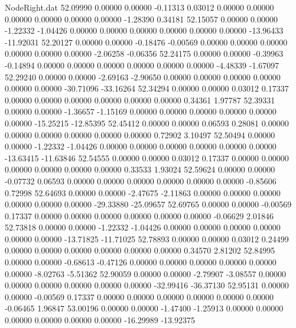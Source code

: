 \begin{filecontents}{NodeRight.dat}
  52.09990    0.00000    0.00000    -0.11313    0.03012    0.00000    0.00000    0.00000    0.00000    0.00000    0.00000   -1.28390    0.34181
  52.15057    0.00000    0.00000    -1.22332   -1.04426    0.00000    0.00000    0.00000    0.00000    0.00000    0.00000  -13.96433  -11.92031
  52.20127    0.00000    0.00000    -0.18476   -0.00569    0.00000    0.00000    0.00000    0.00000    0.00000    0.00000   -2.06258   -0.06356
  52.24175    0.00000    0.00000    -0.39963   -0.14894    0.00000    0.00000    0.00000    0.00000    0.00000    0.00000   -4.48339   -1.67097
  52.29240    0.00000    0.00000    -2.69163   -2.90650    0.00000    0.00000    0.00000    0.00000    0.00000    0.00000  -30.71096  -33.16264
  52.34294    0.00000    0.00000     0.03012    0.17337    0.00000    0.00000    0.00000    0.00000    0.00000    0.00000    0.34361    1.97787
  52.39331    0.00000    0.00000    -1.36657   -1.15169    0.00000    0.00000    0.00000    0.00000    0.00000    0.00000  -15.25215  -12.85395
  52.45412    0.00000    0.00000     0.06593    0.28081    0.00000    0.00000    0.00000    0.00000    0.00000    0.00000    0.72902    3.10497
  52.50494    0.00000    0.00000    -1.22332   -1.04426    0.00000    0.00000    0.00000    0.00000    0.00000    0.00000  -13.63415  -11.63846
  52.54555    0.00000    0.00000     0.03012    0.17337    0.00000    0.00000    0.00000    0.00000    0.00000    0.00000    0.33533    1.93024
  52.59624    0.00000    0.00000    -0.07732    0.06593    0.00000    0.00000    0.00000    0.00000    0.00000    0.00000   -0.85606    0.72998
  52.64693    0.00000    0.00000    -2.47675   -2.11863    0.00000    0.00000    0.00000    0.00000    0.00000    0.00000  -29.33880  -25.09657
  52.69765    0.00000    0.00000    -0.00569    0.17337    0.00000    0.00000    0.00000    0.00000    0.00000    0.00000   -0.06629    2.01846
  52.73818    0.00000    0.00000    -1.22332   -1.04426    0.00000    0.00000    0.00000    0.00000    0.00000    0.00000  -13.71825  -11.71025
  52.78893    0.00000    0.00000     0.03012    0.24499    0.00000    0.00000    0.00000    0.00000    0.00000    0.00000    0.34570    2.81202
  52.84995    0.00000    0.00000    -0.68613   -0.47126    0.00000    0.00000    0.00000    0.00000    0.00000    0.00000   -8.02763   -5.51362
  52.90059    0.00000    0.00000    -2.79907   -3.08557    0.00000    0.00000    0.00000    0.00000    0.00000    0.00000  -32.99416  -36.37130
  52.95131    0.00000    0.00000    -0.00569    0.17337    0.00000    0.00000    0.00000    0.00000    0.00000    0.00000   -0.06465    1.96847
  53.00196    0.00000    0.00000    -1.47400   -1.25913    0.00000    0.00000    0.00000    0.00000    0.00000    0.00000  -16.29989  -13.92375

\end{filecontents}
